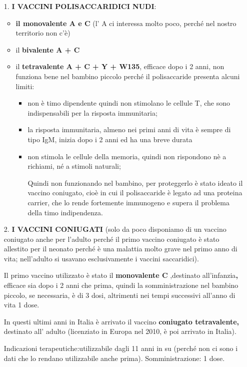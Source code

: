 \begin{itemize}

\item[1.]
  \textbf{I VACCINI POLISACCARIDICI NUDI}:

  \begin{itemize}
  \item
    \textbf{il monovalente A e C} (l' A ci interessa molto poco, perché
    nel nostro territorio non c'è)
  \item
    il \textbf{bivalente A + C}
  \item
    il \textbf{tetravalente A + C + Y + W135}, efficace dopo i 2 anni,
    non funziona bene nel bambino piccolo perché il polisaccaride
    presenta alcuni limiti:

    \begin{itemize}
    \item
      non è timo dipendente quindi non stimolano le cellule T, che sono
      indispensabili per la risposta immunitaria;
    \item
      la risposta immunitaria, almeno nei primi anni di vita è sempre di
      tipo IgM, inizia dopo i 2 anni ed ha una breve durata
    \item
      non stimola le cellule della memoria, quindi non rispondono nè a
      richiami, né a stimoli naturali;

      Quindi non funzionando nel bambino, per proteggerlo è stato ideato
      il vaccino coniugato, cioè in cui il polisaccaride è legato ad una
      proteina carrier, che lo rende fortemente immunogeno e supera il
      problema della timo indipendenza.
    \end{itemize}
  \end{itemize}
\item[2.]
  \textbf{I VACCINI CONIUGATI} (solo da poco disponiamo di un vaccino
  coniugato anche per l'adulto perché il primo vaccino coniugato è stato
  allestito per il neonato perché è una malattia molto grave nel primo
  anno di vita; nell'adulto si usavano esclusivamente i vaccini
  saccaridici).

  Il primo vaccino utilizzato è stato il \textbf{monovalente C}
  ,destinato all'infanzia\textbf{,} efficace sia dopo i 2 anni che
  prima, quindi la somministrazione nel bambino piccolo, se necessaria,
  è di 3 dosi, altrimenti nei tempi successivi all'anno di vita 1 dose.

  In questi ultimi anni in Italia è arrivato il vaccino
  \textbf{coniugato tetravalente,} destinato all' adulto (licenziato in
  Europa nel 2010, è poi arrivato in Italia).

  Indicazioni terapeutiche:utilizzabile dagli 11 anni in su (perché non
  ci sono i dati che lo rendano utilizzabile anche prima).
  Somministrazione: 1 dose.
\end{itemize}

